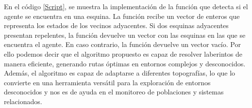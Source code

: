         En el c\'odigo \ref{Script}, se muestra la implementaci\'on de la funci\'on que detecta si el agente se encuentra en una esquina. 
            La funci\'on recibe un vector de enteros que representa los estados de los vecinos adyacentes. Si dos esquinas adyacentes 
            presentan repelentes, la funci\'on devuelve un vector con las esquinas en las que se encuentra el agente. 
            En caso contrario, la funci\'on devuelve un vector vac\'io.
        \vskip 0.5cm
        Por ello podemos decir que el algoritmo propuesto es capaz de resolver laberintos de manera eficiente, 
            generando rutas \'optimas en entornos complejos y desconocidos. Adem\'as, el algoritmo es capaz de 
            adaptarse a diferentes topograf\'ias, lo que lo convierte en una herramienta vers\'atil para la exploraci\'on 
            de entornos desconocidos y nos es de ayuda en el monitoreo de poblaciones y sistemas relacionados.
        \vskip 0.5cm
        
